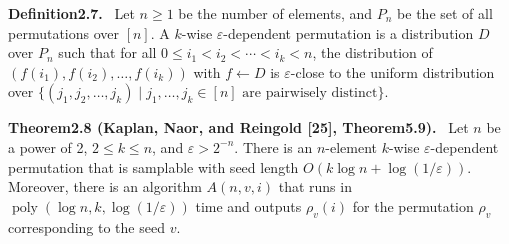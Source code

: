 \documentclass[10pt,a4paper]{article}
\newenvironment{authorclaim}[1]{\par\medskip\noindent\textbf{#1.}\ }{\par\medskip}
\begin{document}
\begin{authorclaim}{Definition2.7}
Let $n\ge1$ be the number of elements, and $P_n$ be the set of all permutations over $[n]$. A $k$-wise $\varepsilon$-dependent permutation is a distribution $D$ over $P_n$ such that for all $0\le i_1<i_2<\cdots<i_k<n$, the distribution of $(f(i_1),f(i_2),\ldots,f(i_k))$ with $f\leftarrow D$ is $\varepsilon$-close to the uniform distribution over $\{(j_1,j_2,\ldots,j_k)\mid j_1,\ldots,j_k\in[n]\text{ are pairwisely distinct}\}$.
\end{authorclaim}
\begin{authorclaim}{Theorem2.8 (Kaplan, Naor, and Reingold [25], Theorem5.9)}
Let $n$ be a power of 2, $2\le k\le n$, and $\varepsilon>2^{-n}$. There is an $n$-element $k$-wise $\varepsilon$-dependent permutation that is samplable with seed length $O(k\log n+\log(1/\varepsilon))$. Moreover, there is an algorithm $A(n,v,i)$ that runs in $\operatorname{poly}(\log n,k,\log(1/\varepsilon))$ time and outputs $\rho_v(i)$ for the permutation $\rho_v$ corresponding to the seed $v$.
\end{authorclaim}
\end{document}
